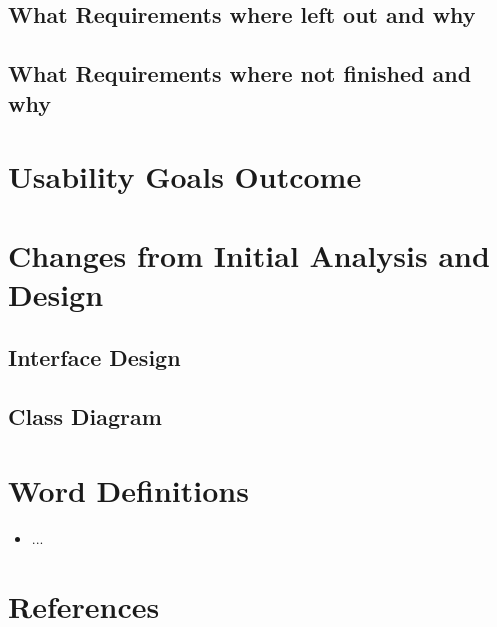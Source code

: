 \documentclass[paper=a4, fontsize=11pt]{scrartcl} %
\numberwithin{equation}{section} %
\numberwithin{figure}{section} %
\numberwithin{table}{section} %
\begin{document}
\subsection{What Requirements where left out and why}
\subsection{What Requirements where not finished and why}

\section{Usability Goals Outcome}

\section{Changes from Initial Analysis and Design}
\subsection{Interface Design}
\subsection{Class Diagram}

\section{Word Definitions}
\begin{itemize}
\item ...
\end{itemize}

\clearpage

\section{References}
\end{document}
